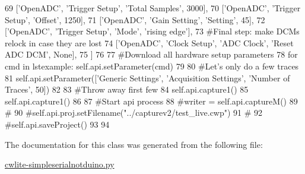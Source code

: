 \begin{DoxyCode}
69                       [\textcolor{stringliteral}{'OpenADC'}, \textcolor{stringliteral}{'Trigger Setup'}, \textcolor{stringliteral}{'Total Samples'}, 3000],
70                       [\textcolor{stringliteral}{'OpenADC'}, \textcolor{stringliteral}{'Trigger Setup'}, \textcolor{stringliteral}{'Offset'}, 1250],
71                       [\textcolor{stringliteral}{'OpenADC'}, \textcolor{stringliteral}{'Gain Setting'}, \textcolor{stringliteral}{'Setting'}, 45],
72                       [\textcolor{stringliteral}{'OpenADC'}, \textcolor{stringliteral}{'Trigger Setup'}, \textcolor{stringliteral}{'Mode'}, \textcolor{stringliteral}{'rising edge'}],
73                       \textcolor{comment}{#Final step: make DCMs relock in case they are lost}
74                       [\textcolor{stringliteral}{'OpenADC'}, \textcolor{stringliteral}{'Clock Setup'}, \textcolor{stringliteral}{'ADC Clock'}, \textcolor{stringliteral}{'Reset ADC DCM'}, \textcolor{keywordtype}{None}],
75                       ]
76         
77         \textcolor{comment}{#Download all hardware setup parameters}
78         \textcolor{keywordflow}{for} cmd \textcolor{keywordflow}{in} lstexample: self.api.setParameter(cmd)
79         
80         \textcolor{comment}{#Let's only do a few traces}
81         self.api.setParameter([\textcolor{stringliteral}{'Generic Settings'}, \textcolor{stringliteral}{'Acquisition Settings'}, \textcolor{stringliteral}{'Number of Traces'}, 50])
82                       
83         \textcolor{comment}{#Throw away first few}
84         self.api.capture1()
85         self.api.capture1()
86 
87         \textcolor{comment}{#Start api process}
88         \textcolor{comment}{#writer = self.api.captureM()}
89         \textcolor{comment}{#}
90         \textcolor{comment}{#self.api.proj.setFilename("../capturev2/test\_live.cwp")}
91         \textcolor{comment}{#}
92         \textcolor{comment}{#self.api.saveProject()}
93 
94 
\end{DoxyCode}


The documentation for this class was generated from the following file\+:\begin{DoxyCompactItemize}
\item 
\hyperlink{cwlite-simpleserialnotduino_8py}{cwlite-\/simpleserialnotduino.\+py}\end{DoxyCompactItemize}
